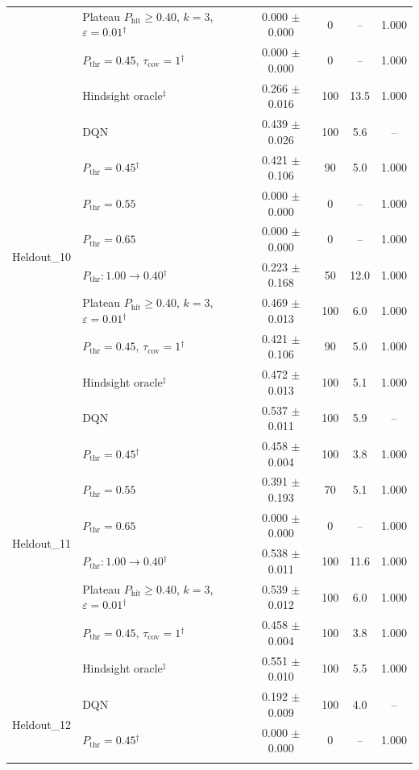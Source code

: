 \begin{table}[htbp]
\begin{tabular}{llcccc}
 & Plateau $P_{\mathrm{hit}}\geq0.40$, $k=3$, $\varepsilon=0.01$$^{\dagger}$ & 0.000 $\pm$ 0.000 & 0 & -- & 1.000 \\
 & $P_{\mathrm{thr}}=0.45$, $\tau_{\mathrm{cov}}=1$$^{\dagger}$ & 0.000 $\pm$ 0.000 & 0 & -- & 1.000 \\
 & Hindsight oracle$^{\ddagger}$ & 0.266 $\pm$ 0.016 & 100 & 13.5 & 1.000 \\
\midrule
\multirow{8}{*}{Heldout\_10} & DQN & 0.439 $\pm$ 0.026 & 100 & 5.6 & -- \\
 & $P_{\mathrm{thr}}=0.45$$^{\dagger}$ & 0.421 $\pm$ 0.106 & 90 & 5.0 & 1.000 \\
 & $P_{\mathrm{thr}}=0.55$ & 0.000 $\pm$ 0.000 & 0 & -- & 1.000 \\
 & $P_{\mathrm{thr}}=0.65$ & 0.000 $\pm$ 0.000 & 0 & -- & 1.000 \\
 & $P_{\mathrm{thr}}: 1.00 \to 0.40$$^{\dagger}$ & 0.223 $\pm$ 0.168 & 50 & 12.0 & 1.000 \\
 & Plateau $P_{\mathrm{hit}}\geq0.40$, $k=3$, $\varepsilon=0.01$$^{\dagger}$ & 0.469 $\pm$ 0.013 & 100 & 6.0 & 1.000 \\
 & $P_{\mathrm{thr}}=0.45$, $\tau_{\mathrm{cov}}=1$$^{\dagger}$ & 0.421 $\pm$ 0.106 & 90 & 5.0 & 1.000 \\
 & Hindsight oracle$^{\ddagger}$ & 0.472 $\pm$ 0.013 & 100 & 5.1 & 1.000 \\
\midrule
\multirow{8}{*}{Heldout\_11} & DQN & 0.537 $\pm$ 0.011 & 100 & 5.9 & -- \\
 & $P_{\mathrm{thr}}=0.45$$^{\dagger}$ & 0.458 $\pm$ 0.004 & 100 & 3.8 & 1.000 \\
 & $P_{\mathrm{thr}}=0.55$ & 0.391 $\pm$ 0.193 & 70 & 5.1 & 1.000 \\
 & $P_{\mathrm{thr}}=0.65$ & 0.000 $\pm$ 0.000 & 0 & -- & 1.000 \\
 & $P_{\mathrm{thr}}: 1.00 \to 0.40$$^{\dagger}$ & 0.538 $\pm$ 0.011 & 100 & 11.6 & 1.000 \\
 & Plateau $P_{\mathrm{hit}}\geq0.40$, $k=3$, $\varepsilon=0.01$$^{\dagger}$ & 0.539 $\pm$ 0.012 & 100 & 6.0 & 1.000 \\
 & $P_{\mathrm{thr}}=0.45$, $\tau_{\mathrm{cov}}=1$$^{\dagger}$ & 0.458 $\pm$ 0.004 & 100 & 3.8 & 1.000 \\
 & Hindsight oracle$^{\ddagger}$ & 0.551 $\pm$ 0.010 & 100 & 5.5 & 1.000 \\
\midrule
\multirow{8}{*}{Heldout\_12} & DQN & 0.192 $\pm$ 0.009 & 100 & 4.0 & -- \\
 & $P_{\mathrm{thr}}=0.45$$^{\dagger}$ & 0.000 $\pm$ 0.000 & 0 & -- & 1.000 \\
$$
\end{tabular}
\end{table}
